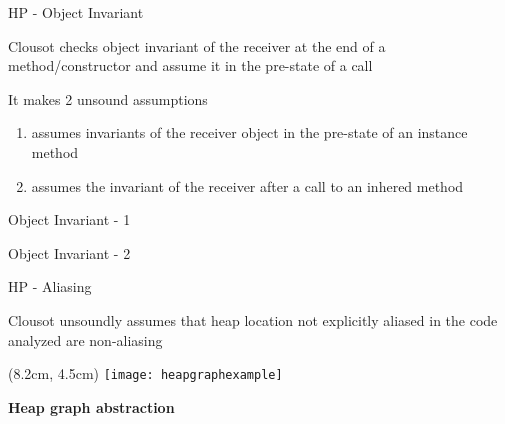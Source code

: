 
\begin{frame}{HP - Object Invariant}

\vspace*{-0.4cm}

Clousot checks object invariant of the receiver at the end of a
method/constructor and assume it in the pre-state of a call

\vfill

It makes 2 unsound assumptions
\begin{enumerate}
\item assumes invariants of the receiver object in the pre-state of an
instance method
\item assumes the invariant of the receiver after a call to an
inhered method
\end{enumerate}

\end{frame}


\begin{frame}[fragile]{Object Invariant - 1}
\vspace*{-0.4cm}
\only<1>{}
\end{frame}


\begin{frame}[fragile]{Object Invariant - 2}
\vspace*{-0.4cm}
\only<1>{}
\end{frame}


\begin{frame}{HP - Aliasing}

\vspace*{-0.4cm}

Clousot unsoundly assumes that heap location not explicitly aliased in the code
analyzed are non-aliasing

\vfill

\begin{textblock*}{1cm}(8.2cm, 4.5cm)
    \texttt{[image: heapgraphexample]}
\end{textblock*}

\textbf{Heap graph abstraction}


\end{frame}

